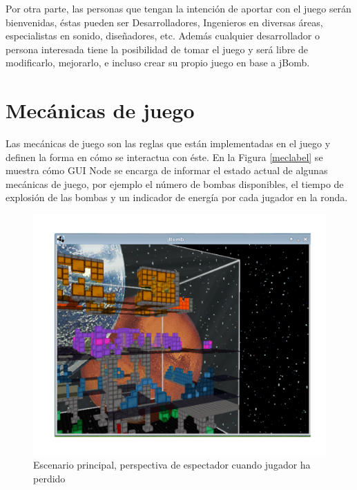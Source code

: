 \documentclass[a4paper,12pt,openany,oneside]{book}
\begin{document}
Por otra parte, las personas que tengan la intención de aportar con el juego serán bienvenidas,  éstas pueden ser Desarrolladores, Ingenieros en diversas áreas, especialistas en sonido, diseñadores, etc. Además cualquier desarrollador o persona interesada tiene la posibilidad de tomar el juego y será libre de modificarlo, mejorarlo, e incluso crear su propio juego en base a jBomb.
\section{Mecánicas de juego}
Las mecánicas de juego son las reglas que están implementadas en el juego y definen la forma en cómo se interactua con éste. En la Figura \ref{meclabel} se muestra cómo GUI Node se encarga de informar el estado actual de algunas mecánicas de juego, por ejemplo el número de bombas disponibles, el tiempo de explosión de las bombas y un indicador de energía por cada jugador en la ronda.

\begin{figure}
\begin{center}
\includegraphics[scale=.7]{img4.pdf}
\end{center}
\caption[Escenario principal, perspectiva de espectador]{Escenario principal, perspectiva de espectador cuando jugador ha perdido}
\end{figure}
\end{document}
